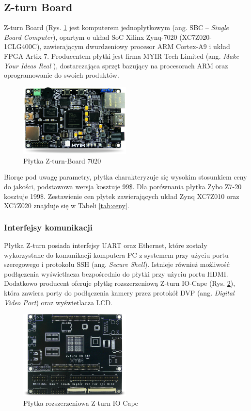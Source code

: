 \subsection{Z-turn Board}

Z-turn Board (Rys. \ref{zturn_board} jest komputerem jednopłytkowym 
(ang. SBC – \emph{Single Board Computer}), opartym o układ SoC Xilinx 
Zynq-7020 (XC7Z020-1CLG400C), zawierającym dwurdzeniowy procesor ARM Cortex-A9 
i układ FPGA Artix 7. Producentem płytki jest firma MYIR Tech Limited (ang. \emph{Make 
Your Ideas Real} ), dostarczająca sprzęt bazujący na procesorach ARM oraz 
oprogramowanie do swoich produktów\cite{myir}. 

\begin{figure}[h]
  \centering
  \includegraphics[width=0.5\textwidth]{img/zturn_board.jpg}
  \caption{Płytka Z-turn-Board 7020}
  \label{zturn_board}
\end{figure}

Biorąc pod uwagę parametry, płytka 
charakteryzuje się wysokim stosunkiem ceny do jakości, podstawowa wersja kosztuje
99\$. Dla porównania płytka Zybo Z7-20 kosztuje 199\$. Zestawienie cen płytek 
zawierających układ Zynq XC7Z010 oraz XC7Z020 znajduje się w Tabeli \ref{tab:ceny}. 

\subsubsection{Interfejsy komunikacji}

Płytka Z-turn posiada interfejsy UART oraz Ethernet, które zostały wykorzystane do 
komunikacji komputera PC z systemem przy użyciu portu szeregowego  
i protokołu SSH (ang. \emph{Secure Shell}). Istnieje również możliwość podłączenia 
wyświetlacza bezpośrednio do płytki przy użyciu portu HDMI. Dodatkowo producent 
oferuje płytkę rozszerzeniową Z-turn IO-Cape (Rys. \ref{iocape}), która zawiera 
porty do podłączenia kamery przez protokół DVP (ang. \emph{Digital Video Port}) 
oraz wyświetlacza LCD.

\begin{figure}[h]
  \centering
  \includegraphics[width=0.5\textwidth]{img/iocape.png}
  \caption{Płytka rozszerzeniowa Z-turn IO Cape}
  \label{iocape}
\end{figure}

